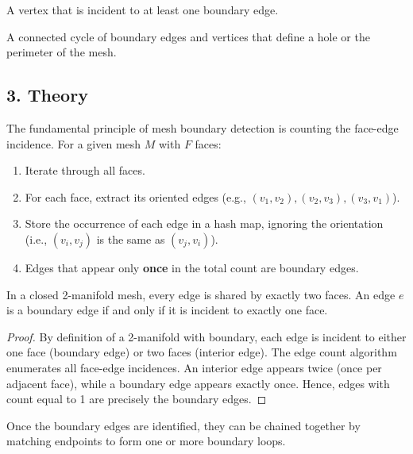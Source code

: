 \begin{definition}\label{def:boundary_vertex}
A vertex that is incident to at least one boundary edge.
\end{definition}

\begin{definition}\label{def:boundary_loop}
A connected cycle of boundary edges and vertices that define a hole or the perimeter of the mesh.
\end{definition}

\subsection{3. Theory}

The fundamental principle of mesh boundary detection is counting the face-edge incidence. For a given mesh $M$ with $F$ faces:
\begin{enumerate}
    \item Iterate through all faces.
    \item For each face, extract its oriented edges (e.g., $(v_1, v_2), (v_2, v_3), (v_3, v_1)$).
    \item Store the occurrence of each edge in a hash map, ignoring the orientation (i.e., $(v_i, v_j)$ is the same as $(v_j, v_i)$).
    \item Edges that appear only \textbf{once} in the total count are boundary edges.
\end{enumerate}

\begin{theorem}\label{thm:boundary_edge_char}
In a closed 2-manifold mesh, every edge is shared by exactly two faces. An edge $e$ is a boundary edge if and only if it is incident to exactly one face.
\end{theorem}

\begin{proof}
By definition of a 2-manifold with boundary, each edge is incident to either one face (boundary edge) or two faces (interior edge). The edge count algorithm enumerates all face-edge incidences. An interior edge appears twice (once per adjacent face), while a boundary edge appears exactly once. Hence, edges with count equal to 1 are precisely the boundary edges.
\end{proof}

Once the boundary edges are identified, they can be chained together by matching endpoints to form one or more boundary loops.


